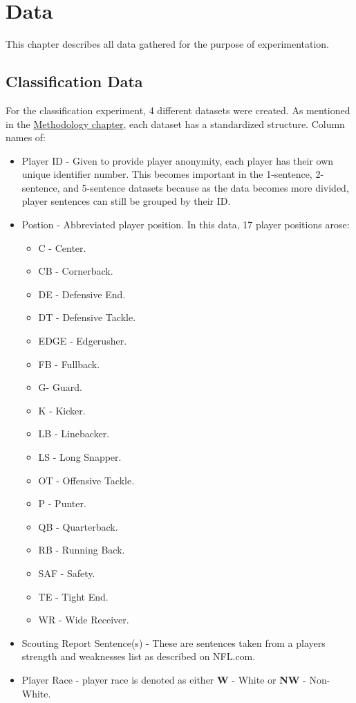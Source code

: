 \documentclass[oneside,12pt]{Classes/RoboticsLaTeX}
\begin{document}
\chapter{Data}
\label{chap:data}
This chapter describes all data gathered for the purpose of experimentation.
\section{Classification Data}
\label{sec:class_data}
For the classification experiment, 4 different datasets were created. As mentioned in the \hyperref[chap:methodology]{Methodology chapter}, each dataset has a standardized structure. Column names of:
\begin{itemize}
  \item Player ID - Given to provide player anonymity, each player has their own unique identifier number. This becomes important in the 1-sentence, 2-sentence, and 5-sentence datasets because as the data becomes more divided, player sentences can
        still be grouped by their ID.
  \item Postion - Abbreviated player position. In this data, 17 player positions arose: \begin{itemize}
    \item C - Center.
    \item CB - Cornerback.
    \item DE - Defensive End.
    \item DT - Defensive Tackle.
    \item EDGE - Edgerusher.
    \item FB - Fullback.
    \item G- Guard.
    \item K - Kicker.
    \item LB - Linebacker.
    \item LS - Long Snapper.
    \item OT - Offensive Tackle.
    \item P - Punter.
    \item QB - Quarterback.
    \item RB - Running Back.
    \item SAF - Safety.
    \item TE - Tight End.
    \item WR - Wide Receiver.
  \end{itemize}
  \item Scouting Report Sentence(s) - These are sentences taken from a players strength and weaknesses list as described on NFL.com.
  \item Player Race - player race is denoted as either \textbf{W} - White or \textbf{NW} - Non-White.
\end{itemize}
\end{document}
